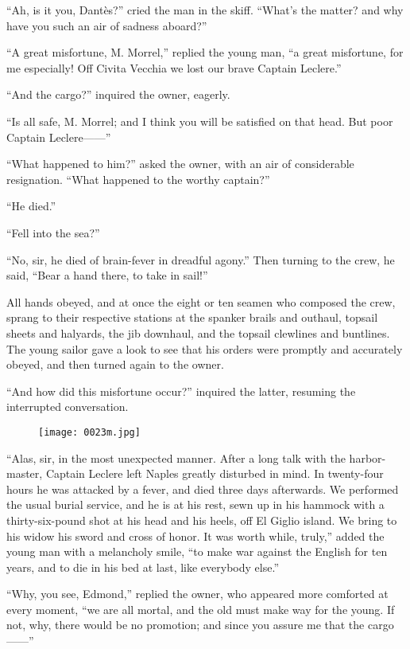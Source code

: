 “Ah, is it you, Dantès?” cried the man in the skiff. “What’s the
matter? and why have you such an air of sadness aboard?”

“A great misfortune, M. Morrel,” replied the young man, “a great
misfortune, for me especially! Off Civita Vecchia we lost our brave
Captain Leclere.”

“And the cargo?” inquired the owner, eagerly.

“Is all safe, M. Morrel; and I think you will be satisfied on that
head. But poor Captain Leclere——”

“What happened to him?” asked the owner, with an air of considerable
resignation. “What happened to the worthy captain?”

“He died.”

“Fell into the sea?”

“No, sir, he died of brain-fever in dreadful agony.” Then turning to
the crew, he said, “Bear a hand there, to take in sail!”

All hands obeyed, and at once the eight or ten seamen who composed the
crew, sprang to their respective stations at the spanker brails and
outhaul, topsail sheets and halyards, the jib downhaul, and the topsail
clewlines and buntlines. The young sailor gave a look to see that his
orders were promptly and accurately obeyed, and then turned again to
the owner.

“And how did this misfortune occur?” inquired the latter, resuming the
interrupted conversation.

\begin{figure}[ht]
\texttt{[image: 0023m.jpg]}
\end{figure}

“Alas, sir, in the most unexpected manner. After a long talk with the
harbor-master, Captain Leclere left Naples greatly disturbed in mind.
In twenty-four hours he was attacked by a fever, and died three days
afterwards. We performed the usual burial service, and he is at his
rest, sewn up in his hammock with a thirty-six-pound shot at his head
and his heels, off El Giglio island. We bring to his widow his sword
and cross of honor. It was worth while, truly,” added the young man
with a melancholy smile, “to make war against the English for ten
years, and to die in his bed at last, like everybody else.”

“Why, you see, Edmond,” replied the owner, who appeared more comforted
at every moment, “we are all mortal, and the old must make way for the
young. If not, why, there would be no promotion; and since you assure
me that the cargo——”

